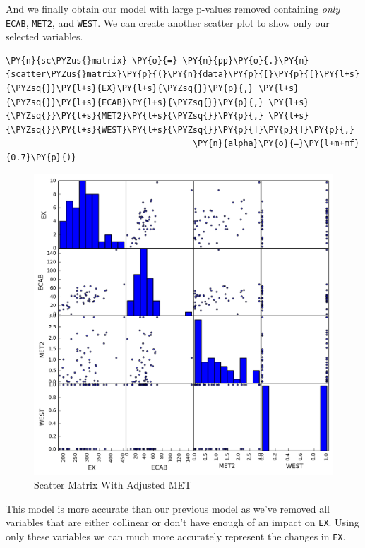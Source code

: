 \documentclass[10pt]{article}\usepackage[]{graphicx}\usepackage[]{xcolor}
\begin{document}
    And we finally obtain our model with large p-values removed containing
\emph{only} \texttt{ECAB}, \texttt{MET2}, and \texttt{WEST}. We can
create another scatter plot to show only our selected variables.

    \begin{Verbatim}[commandchars=\\\{\}]
\PY{n}{sc\PYZus{}matrix} \PY{o}{=} \PY{n}{pp}\PY{o}{.}\PY{n}{scatter\PYZus{}matrix}\PY{p}{(}\PY{n}{data}\PY{p}{[}\PY{p}{[}\PY{l+s}{\PYZsq{}}\PY{l+s}{EX}\PY{l+s}{\PYZsq{}}\PY{p}{,} \PY{l+s}{\PYZsq{}}\PY{l+s}{ECAB}\PY{l+s}{\PYZsq{}}\PY{p}{,} \PY{l+s}{\PYZsq{}}\PY{l+s}{MET2}\PY{l+s}{\PYZsq{}}\PY{p}{,} \PY{l+s}{\PYZsq{}}\PY{l+s}{WEST}\PY{l+s}{\PYZsq{}}\PY{p}{]}\PY{p}{]}\PY{p}{,}
                                     \PY{n}{alpha}\PY{o}{=}\PY{l+m+mf}{0.7}\PY{p}{)}
\end{Verbatim}

    \begin{figure}[H]
        \centering
        \includegraphics[scale=0.6]{./img/scatter_matrix2.png}
        \caption{Scatter Matrix With Adjusted MET}
        \label{fig:scatter_matrix2}
    \end{figure}
    
    This model is more accurate than our previous model as we've removed all variables that are either collinear or
    don't have enough of an impact on \texttt{EX}. Using only these variables we can much more accurately represent the
    changes in \texttt{EX}.
\end{document}
